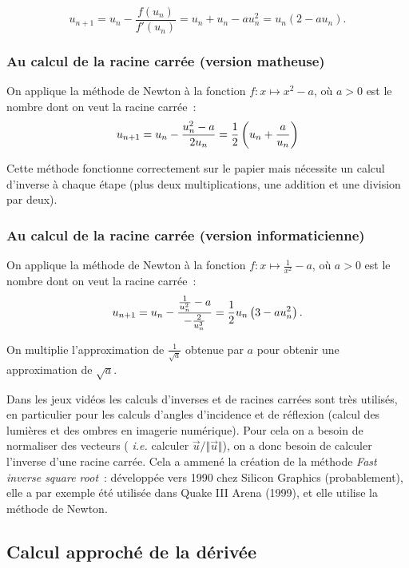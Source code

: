 \begin{equation*}
  u_{n+1} = u_{n} - \frac{f(u_{n})}{f'(u_{n})}
  = u_{n} + u_{n} - a  u_{n}^{2} = u_{n}(2 - au_{n}).
\end{equation*}

\subsubsection{Au calcul de la racine carrée (version matheuse)}

On applique la méthode de Newton à la fonction
$f:x\mapsto x^{2} -a$, où $a>0$ est le nombre dont on veut la racine
carrée~:
\begin{equation*}
  u_{n+1} = u_{n} - \frac{u_{n}^{2}-a}{2u_{n}}
  = \frac{1}{2}\left( u_{n}+\frac{a}{u_{n}}\right)
\end{equation*}

Cette méthode fonctionne correctement sur le papier mais nécessite un calcul d'inverse à chaque étape
(plus deux multiplications, une addition et une division par deux).
\subsubsection{Au calcul de la racine carrée (version
  informaticienne)}
On applique la méthode de Newton à la fonction
$f:x\mapsto \frac{1}{x^{2}} -a$, où $a>0$ est le nombre dont on veut
la racine carrée~:
\begin{equation*}
  u_{n+1} = u_{n} - \frac{\frac{1}{u_{n}^{2}}-a}{-\frac{2}{u_{n}^{3}}}
  = \frac{1}{2}u_{n}\left( 3 - au_{n}^{2}\right).
\end{equation*}

On multiplie l'approximation de $\frac{1}{\sqrt{a}}$ obtenue par $a$
pour obtenir une approximation de $\sqrt{a}$.

Dans les jeux vidéos les calculs d'inverses et de racines carrées sont très utilisés, en particulier pour les calculs 
d'angles d'incidence et de réflexion (calcul des
  lumières et des ombres en imagerie numérique). Pour cela on a besoin de normaliser des vecteurs ( \emph{i.e.} 
calculer $\vec{u}/{\Vert\vec{u}}\Vert$), on a donc besoin de calculer l'inverse d'une racine carrée. Cela a ammené la création de la
méthode \emph{Fast inverse square root}~: développée vers 1990 chez Silicon Graphics (probablement), elle a par exemple 
été utilisée dans Quake III Arena (1999), et elle utilise la méthode de Newton.

\subsection{Calcul approché de la dérivée}


